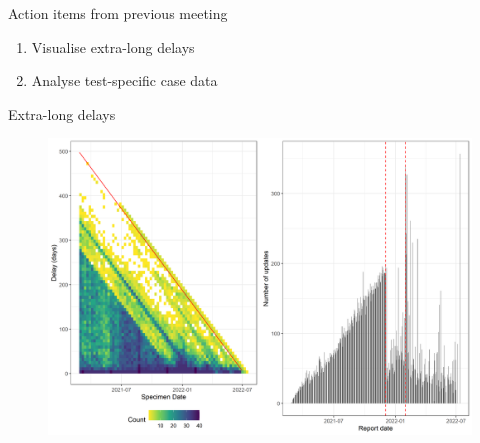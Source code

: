 \documentclass[
  ignorenonframetext,
]{beamer}
\author{Ryan Teo}
\date{2022-07-19}
\providecommand{\tightlist}{%
  \setlength{\itemsep}{0pt}\setlength{\parskip}{0pt}}\usepackage{longtable,booktabs,array}
\begin{document}
\ifdefined\Shaded\renewenvironment{Shaded}{\begin{tcolorbox}[sharp corners, boxrule=0pt, interior hidden, enhanced, breakable, frame hidden, borderline west={3pt}{0pt}{shadecolor}]}{\end{tcolorbox}}\fi

\begin{frame}{Action items from previous meeting}
\protect\hypertarget{action-items-from-previous-meeting}{}
\begin{enumerate}
\tightlist
\item
  Visualise extra-long delays
\item
  Analyse test-specific case data
\end{enumerate}
\end{frame}

\begin{frame}{Extra-long delays}
\protect\hypertarget{extra-long-delays}{}
\begin{figure}

{\centering \includegraphics{progress_presentation_files/figure-beamer/unnamed-chunk-2-1.png}

}

\end{figure}
\end{frame}
\end{document}
